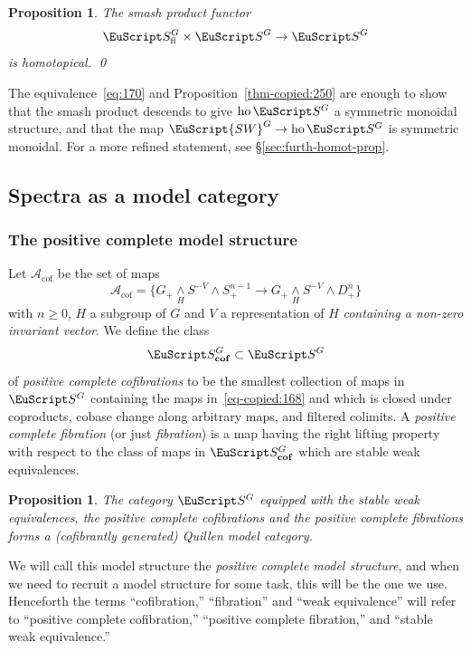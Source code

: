 \documentclass{amsart}
\newtheorem{prop}[equation]{Proposition}
\theoremstyle{definition}
\theoremstyle{remark}
\newcommand{\spectra}{\EuScript S}
\newcommand{\swg}[1]{\EuScript {SW}^{#1}}
\DeclareMathOperator{\ho}{ho}
\newcommand{\smashove}[1]{\underset{#1}{\wedge}}
\newcommand{\ugspectra}[1]{\spectra^{#1}}
\newcommand{\flugspectra}[1]{\spectra^{#1}_{\text{fl}}}
\newcommand{\pscofib}[1]{\spectra^{#1}_{\mathbf{cof}}}
\newcommand{\gencof}{\mathcal A_{\text{cof}}}
\begin{document}
\begin{prop}
\label{thm:261} The smash product functor
\[
\flugspectra{G}\times \ugspectra{G} \to \ugspectra{G} 
\]
is homotopical. \qed
\end{prop}

The equivalence~\eqref{eq:170} and
Proposition~\ref{thm-copied:250} are enough to show that the smash
product descends to give $\ho\ugspectra{G}$ a symmetric monoidal
structure, and that the map $\swg{G}\to\ho\ugspectra{G}$ is symmetric
monoidal.  For a more refined statement, see \S\ref{sec:furth-homot-prop}.

\subsection{Spectra as a model category}
\label{sec:spectra-as-model}
\subsubsection{The positive complete model structure}
\label{sec:strong-posit-stable}
Let $\gencof$ be the set of maps
\begin{equation}
\label{eq-copied:168}
\gencof = \{G_{+}\smashove{H} S^{-V}\wedge S^{n-1}_{+}\to
G_{+}\smashove{H} S^{-V}\wedge D^{n}_{+} \}
\end{equation}
with $n\ge 0$, $H$ a subgroup of $G$ and $V$ a representation of $H$
{\em containing a non-zero invariant vector}.  We define the class
\[
\pscofib{G} \subset\ugspectra{G}
\]
of {\em positive complete cofibrations} to be the smallest collection
of maps in $\ugspectra{G}$ containing the maps
in~\eqref{eq-copied:168} and which is closed under coproducts, cobase
change along arbitrary maps, and filtered colimits.  A {\em positive
complete fibration} (or just {\em fibration}) is a map having the
right lifting property with respect to the class of maps in
$\pscofib{G}$ which are stable weak equivalences.

\begin{prop}
\label{thm-copied:248} The category $\ugspectra{G}$ equipped with the stable
weak equivalences, the positive complete cofibrations and the
positive complete fibrations forms a (cofibrantly generated)
Quillen model category.
\end{prop}


We will call this model structure the {\em positive complete
model structure}, and when we need to recruit a model structure for
some task, this will be the one we use.   Henceforth the terms
``cofibration,'' ``fibration'' and ``weak equivalence'' will refer to
``positive complete cofibration,'' ``positive complete
fibration,'' and ``stable weak equivalence.''
\end{document}
